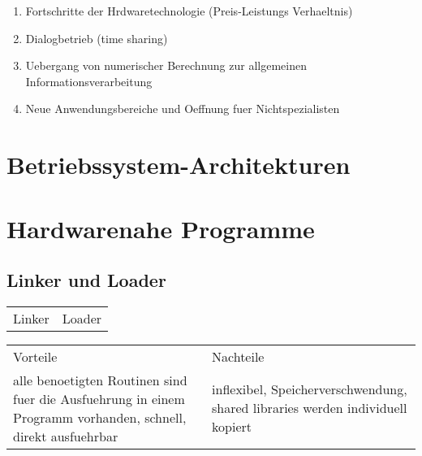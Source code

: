 \begin{enumerate}
	\setlength\itemsep{0em}
	\item Fortschritte der Hrdwaretechnologie (Preis-Leistungs Verhaeltnis)
	\item Dialogbetrieb (time sharing)
	\item Uebergang von numerischer Berechnung zur allgemeinen Informationsverarbeitung
	\item Neue Anwendungsbereiche und Oeffnung fuer Nichtspezialisten 
\end{enumerate}

\section{Betriebssystem-Architekturen}

\section{Hardwarenahe Programme}
\subsection{Linker und Loader}
\begin{tabularx}{\textwidth}{X X}
	Linker&			Loader \\
\end{tabularx}

\begin{tabularx}{\textwidth}{X X}
	Vorteile& Nachteile\\
	alle benoetigten Routinen sind fuer die Ausfuehrung in einem Programm vorhanden, schnell, direkt ausfuehrbar& inflexibel, Speicherverschwendung, shared libraries werden individuell kopiert\\ 
\end{tabularx}
